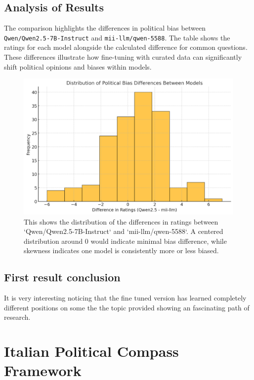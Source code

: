 \documentclass{article}
\begin{document}
\subsection{Analysis of Results}
The comparison highlights the differences in political bias between \texttt{Qwen/Qwen2.5-7B-Instruct} and \texttt{mii-llm/qwen-5588}. The table shows the ratings for each model alongside the calculated difference for common questions. These differences illustrate how fine-tuning with curated data can significantly shift political opinions and biases within models.
\begin{figure}[ht!]
    \centering
    \includegraphics[width=\textwidth]{qwen_vs_miillm_bars.png}
    \caption{This shows the distribution of the differences in ratings between `Qwen/Qwen2.5-7B-Instruct` and `mii-llm/qwen-5588`. A centered distribution around 0 would indicate minimal bias difference, while skewness indicates one model is consistently more or less biased.}
    \label{fig:qwen_vs_miillm_bars}
\end{figure}
\subsection*{First result conclusion}
It is very interesting noticing that the fine tuned version has learned completely different positions on some the the topic provided showing an fascinating path of research.

\section{Italian Political Compass Framework}
\end{document}
